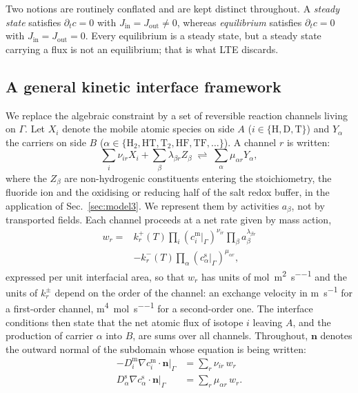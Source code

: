\documentclass[5p]{elsarticle}
\newcommand{\cm}[1]{c^{\mathrm{m}}_{#1}}   %
\newcommand{\cs}[1]{c^{\mathrm{s}}_{#1}}   %
\begin{document}
Two notions are routinely conflated and are kept distinct throughout.
A \emph{steady state} satisfies $\partial_t c = 0$ with $J_\mathrm{in} = J_\mathrm{out} \neq 0$, whereas \emph{equilibrium} satisfies $\partial_t c = 0$ with $J_\mathrm{in} = J_\mathrm{out} = 0$.
Every equilibrium is a steady state, but a steady state carrying a flux is not an equilibrium; that is what LTE discards.

\subsection{A general kinetic interface framework}
\label{sec:general}

We replace the algebraic constraint by a set of reversible reaction channels living on $\Gamma$. Let $X_i$ denote the mobile atomic species on side $A$ ($i \in \{\mathrm{H,D,T}\}$) and $Y_\alpha$ the carriers on side $B$ ($\alpha \in \{\mathrm{H_2, HT, T_2, HF, TF},\dots\}$).
A channel $r$ is written:
\begin{equation}
    \sum_i \nu_{ir} X_i + \sum_\beta \lambda_{\beta r} Z_\beta
    \;\rightleftharpoons\; \sum_\alpha \mu_{\alpha r} Y_\alpha,
    \label{eq:channel}
\end{equation}
where the $Z_\beta$ are non-hydrogenic constituents entering the stoichiometry, the fluoride ion and the oxidising or reducing half of the salt redox buffer, in the application of Sec.~\ref{sec:model3}. 
We represent them by activities $a_\beta$, not by transported fields. 
Each channel proceeds at a net rate given by mass action,
\begin{equation}
    \begin{split}
        w_r = {}& k_r^{+}(T)\prod_i \left(\cm{i}\big|_\Gamma\right)^{\nu_{ir}}
                  \prod_\beta a_\beta^{\lambda_{\beta r}} \\
              &- k_r^{-}(T)\prod_\alpha \left(\cs{\alpha}\big|_\Gamma\right)^{\mu_{\alpha r}} ,
    \end{split}
    \label{eq:mass_action}
\end{equation}
expressed per unit interfacial area, so that $w_r$ has units of \unit{\mole\per\square\metre\per\second} and the units of $k_r^{\pm}$ depend on the order of the channel: an exchange velocity in \unit{\metre\per\second} for a first-order channel, \unit{\metre\tothe{4}\per\mole\per\second} for a second-order one.
The interface conditions then state that the net atomic flux of isotope $i$ leaving $A$, and the production of carrier $\alpha$ into $B$, are sums over all channels.
Throughout, $\mathbf{n}$ denotes the outward normal of the subdomain whose equation is being written:
\begin{align}
    -D^{\mathrm{m}}_i \nabla \cm{i}\cdot \mathbf{n}\big|_\Gamma
        &= \sum_r \nu_{ir}\, w_r
    \label{eq:bc_metal}\\
     D^{\mathrm{s}}_\alpha \nabla \cs{\alpha}\cdot \mathbf{n}\big|_\Gamma
        &= \sum_r \mu_{\alpha r}\, w_r.
    \label{eq:bc_salt}
\end{align}
\end{document}
